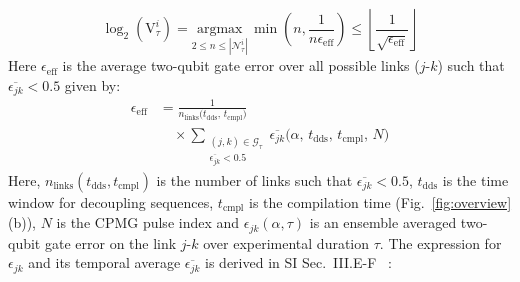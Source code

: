 \documentclass[%
 reprint,
 superscriptaddress,
 amsmath,amssymb,
 aps,
 prx,
]{revtex4-2}
\begin{document}
\begin{equation}
\log_{2}(\text{V}^i_\tau) = 
\underset{2 \le n \le |\mathcal{N}^i_{\tau}|}{\text{argmax}}\, 
\min\left(n, \frac{1}{n\epsilon_{\text{eff}}}\right) 
\le 
\left\lfloor \frac{1}{\sqrt{\epsilon_{\text{eff}}}} \right\rfloor
\end{equation}
Here $\epsilon_{\text{eff}}$ is the average two-qubit gate error over all possible links ($j$-$k$) such that $\overline{\epsilon_{jk}}<0.5$ given by:
\begin{equation}
\begin{split}
  \epsilon_{\mathrm{eff}}
  &= \frac{1}{n_{\mathrm{links}}\bigl(t_{\mathrm{dds}},\,t_{\mathrm{cmpl}}\bigr)} \\[0.5ex]
  &\quad\times
    \sum_{\substack{(j,k)\in\mathcal{G}_{\tau} \\ \overline{\epsilon_{jk}}<0.5}}
      \overline{\epsilon_{jk}}\bigl(
        \alpha,\,
        t_{\mathrm{dds}},\,
        t_{\mathrm{cmpl}},\,
        N
      \bigr)
\end{split}
\label{eq:eps_eff}
\end{equation}
Here, $n_{\text{links}}(t_{\text{dds}},t_{\text{cmpl}})$ is the number of links such that $\overline{\epsilon_{jk}}<0.5$, $t_{\text{dds}}$ is the time window for decoupling sequences, $t_{\text{cmpl}}$ is the compilation time (Fig.~\ref{fig:overview}(b)), $N$ is the CPMG pulse index and $\epsilon_{jk}(\alpha,\tau)$ is an ensemble averaged two-qubit gate error on the link $j$-$k$ over experimental duration $\tau$. The expression for $\epsilon_{jk}$ and its temporal average $\overline{\epsilon_{jk}}$ is derived in SI Sec.~III.E-F ~\cite{googleSI_Programmable_Quantum_Matter_2025Google}:

\par\vspace{0.75\baselineskip} %
\end{document}
